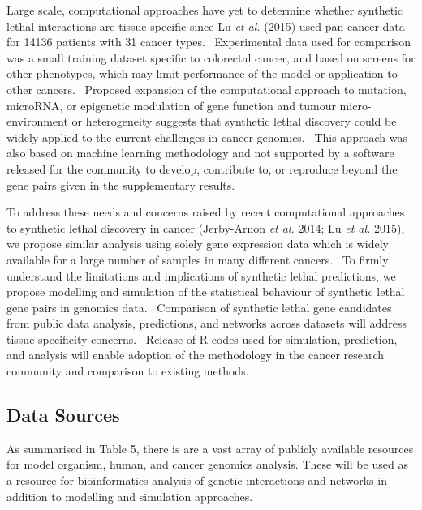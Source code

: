 Large scale, computational approaches have yet to determine whether
synthetic lethal interactions are tissue-specific since
\hyperlink{ENREF74}{Lu}\hyperlink{ENREF74}{\textit{ et
al.}}\hyperlink{ENREF74}{ (2015)} used pan-cancer data for 14136
patients with 31 cancer types. \ Experimental data used for comparison
was a small training dataset specific to colorectal cancer, and based
on screens for other phenotypes, which may limit performance of the
model or application to other cancers. \ Proposed expansion of the
computational approach to mutation, microRNA, or epigenetic modulation
of gene function and tumour micro-environment or heterogeneity suggests
that synthetic lethal discovery could be widely applied to the current
challenges in cancer genomics. \ This approach was also based on
machine learning methodology and not supported by a software released
for the community to develop, contribute to, or reproduce beyond the
gene pairs given in the supplementary results.


To address these needs and concerns raised by recent computational
approaches to synthetic lethal discovery in cancer (Jerby-Arnon\textit{
et al.} 2014; Lu\textit{ et al.} 2015), we propose similar analysis
using solely gene expression data which is widely available for a large
number of samples in many different cancers. \ To firmly understand the
limitations and implications of synthetic lethal predictions, we
propose modelling and simulation of the statistical behaviour of
synthetic lethal gene pairs in genomics data. \ Comparison of synthetic
lethal gene candidates from public data analysis, predictions, and
networks across datasets will address tissue-specificity concerns.
\ Release of R codes used for simulation, prediction, and analysis will
enable adoption of the methodology in the cancer research community and
comparison to existing methods.


\clearpage\subsection[Data Sources]{Data Sources}

As summarised in Table 5, there is are a vast array of publicly
available resources for model organism, human, and cancer genomics
analysis. These will be used as a resource for bioinformatics analysis
of genetic interactions and networks in addition to modelling and
simulation approaches. 


